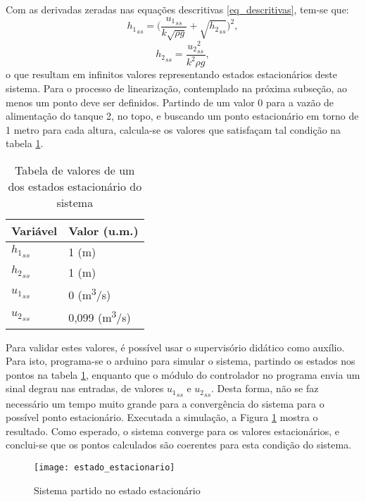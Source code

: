 Com as derivadas zeradas nas equações descritivas \ref{eq_descritivas}, tem-se que:
\begin{equation}
{h_1}_{ss} = \bigg(\frac{{u_1}_{ss}}{k\sqrt{\rho g}} + \sqrt{{h_2}_{ss}}\bigg)^2,
\end{equation}
\begin{equation}
{h_2}_{ss} = \frac{{u_2}_{ss}^2}{k^2 \rho g},
\end{equation}
o que resultam em infinitos valores representando estados estacionários deste sistema. Para o processo de linearização, contemplado na próxima subseção, ao menos um ponto deve ser definidos. Partindo de um valor 0 para a vazão de alimentação do tanque 2, no topo, e buscando um ponto estacionário em torno de 1 metro para cada altura, calcula-se os valores que satisfaçam tal condição na tabela \ref{tbl_ss}.

\begin{table}[htb]
	\centering
	\caption{Tabela de valores de um dos estados estacionário do sistema}
	\begin{tabular} {|m{5em} m{8em}|}
		\hline
		Variável & Valor (u.m.) \\
		\hline
		${h_1}_{ss}$ & 1 (m) \\
		${h_2}_{ss}$ & 1 (m) \\
		${u_1}_{ss}$ & 0 (m\textsuperscript{3}/s) \\
		${u_2}_{ss}$ & 0,099 (m\textsuperscript{3}/s)\\
		\hline
	\end{tabular}
	\label{tbl_ss}
\end{table}

Para validar estes valores, é possível usar o supervisório didático como auxílio. Para isto, programa-se o arduino para simular o sistema, partindo os estados nos pontos na tabela \ref{tbl_ss}, enquanto que o módulo do controlador no programa envia um sinal degrau nas entradas, de valores ${u_1}_{ss}$ e ${u_2}_{ss}$. Desta forma, não se faz necessário um tempo muito grande para a convergência do sistema para o possível ponto estacionário. Executada a simulação, a Figura \ref{img_ss} mostra o resultado. Como esperado, o sistema converge para os valores estacionários, e conclui-se que os pontos calculados são coerentes para esta condição do sistema.

\begin{figure}[htb]
	\centering
	\caption{Sistema partido no estado estacionário}
	\texttt{[image: estado\_estacionario]}
	\label{img_ss}
\end{figure}

